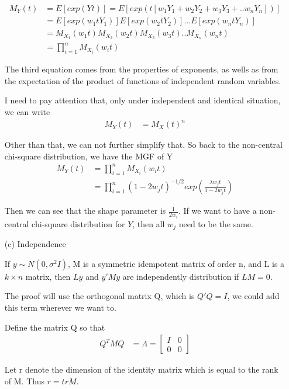 \begin{itemize}
\begin{align*}
	M_Y(t) &= E[exp(Y t)] = E[exp(t [w_1 Y_1 + w_2 Y_2 + w_3 Y_3 +.. w_n Y_n])]\\
	&= E[exp(w_1 t Y_1)]E[exp(w_2 t Y_2)]... E[exp(w_n t Y_n)]\\
	&= M_{X_1}(w_1 t) M_{X_2}(w_2 t) M_{X_3}(w_3 t).. M_{X_n}(w_n t)\\
	&= \prod_{i=1}^n M_{X_i}(w_i t)
\end{align*}

The third equation comes from the properties of exponents, as wells as from the expectation of the product of functions of independent random variables. 

I need to pay attention that, only under independent and identical situation, we can write
 \begin{align*}
 	M_Y(t) &= M_{X}(t)^n
 \end{align*}

Other than that, we can not further simplify that. So back to the non-central chi-square distribution, we have the MGF of Y
\begin{align*}
	M_Y(t) &= \prod_{i=1}^n M_{X_i}(w_i t)\\
	&=\prod_{i=1}^n  (1-2 w_jt)^{-1/2} exp \left( \frac{ \lambda w_j t }{1-2 w_j t} \right)
\end{align*}

Then we can see that the shape parameter is $\frac{1}{2 w_i}$. If we want to have a non-central chi-square distribution for $Y$, then all $w_j$ need to be the same. 


\item[(c)] Independence 

If $y \sim N(0, \sigma^2 I)$, M is a symmetric idempotent matrix of order n, and L is a $k \times n$ matrix, then $Ly$ and $y' M y$ are independently distribution if $LM = 0$.


The proof will use the orthogonal matrix Q, which is $Q'Q = I$, we could add this term wherever we want to.

Define the matrix Q so that
 \begin{align*}
	Q^T M Q &= \Lambda = \begin{bmatrix}
	I & 0\\
	0 & 0
	\end{bmatrix}
\end{align*}

Let r denote the dimension of the identity matrix which is equal to the rank of M. Thus $r = tr M$.


\end{itemize}
